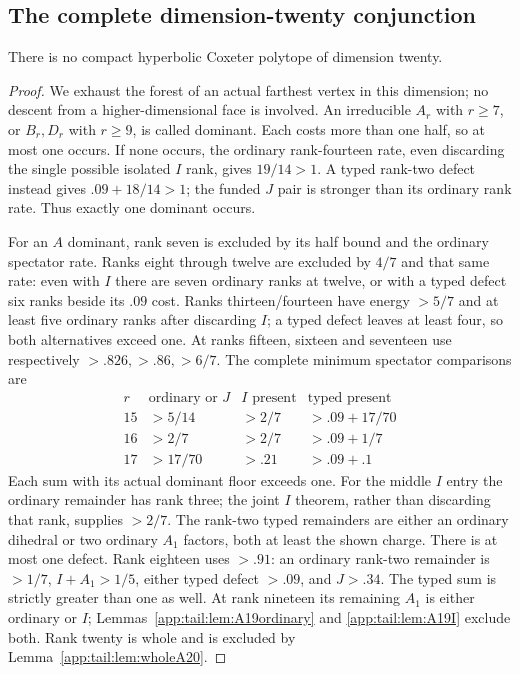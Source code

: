 \subsection{The complete dimension-twenty conjunction}
\begin{proposition}\label{app:tail:prop:exact20}
There is no compact hyperbolic Coxeter polytope of dimension twenty.
\end{proposition}
\begin{proof}
We exhaust the forest of an actual farthest vertex in this dimension;
no descent from a higher-dimensional face is involved.
An irreducible $A_r$ with $r\ge7$, or $B_r,D_r$ with $r\ge9$,
is called dominant. Each costs more than one half, so at most
one occurs. If none occurs, the ordinary rank-fourteen rate,
even discarding the single possible isolated $I$ rank, gives
$19/14>1$. A typed rank-two defect instead gives
$.09+18/14>1$; the funded $J$ pair is stronger than its ordinary
rank rate. Thus exactly one dominant occurs.

For an $A$ dominant, rank seven is excluded by its half bound
and the ordinary spectator rate. Ranks eight through twelve
are excluded by $4/7$ and that same rate: even with $I$
there are seven ordinary ranks at twelve, or with a typed
defect six ranks beside its $.09$ cost.
Ranks thirteen/fourteen have energy $>5/7$ and at least five
ordinary ranks after discarding $I$; a typed defect leaves at
least four, so both alternatives exceed one.
At ranks fifteen, sixteen and seventeen use respectively
$>.826,>.86,>6/7$.
The complete minimum spectator comparisons are
\[
\begin{array}{c|c|c|c}
r&\text{ordinary or }J& I\text{ present}&\text{typed present}\\\hline
15&>5/14&>2/7&>.09+17/70\\
16&>2/7&>2/7&>.09+1/7\\
17&>17/70&>.21&>.09+.1
\end{array}
\]
Each sum with its actual dominant floor exceeds one.
For the middle $I$ entry the ordinary remainder has rank three;
the joint $I$ theorem, rather than discarding that rank, supplies
$>2/7$. The rank-two typed remainders are either an ordinary
dihedral or two ordinary $A_1$ factors, both at least the shown
charge. There is at most one defect.
Rank eighteen uses $>.91$: an ordinary rank-two remainder is
$>1/7$, $I+A_1>1/5$, either typed defect $>.09$, and $J>.34$.
The typed sum is strictly greater than one as well.
At rank nineteen its remaining $A_1$ is either ordinary or $I$;
Lemmas~\ref{app:tail:lem:A19ordinary} and
\ref{app:tail:lem:A19I} exclude both. Rank twenty is whole and
is excluded by Lemma~\ref{app:tail:lem:wholeA20}.


\end{proof}
